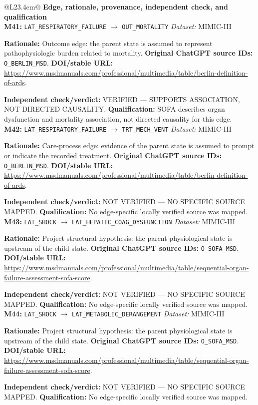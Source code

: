 \begin{tabular}{@{}L{23.4cm}@{}}
\toprule
\textbf{Edge, rationale, provenance, independent check, and qualification}\\
\midrule
\textbf{M41:} \nolinkurl{LAT_RESPIRATORY_FAILURE} $\rightarrow$ \nolinkurl{OUT_MORTALITY} \hfill \textit{Dataset:} MIMIC-III\par\textbf{Rationale:} Outcome edge: the parent state is assumed to represent pathophysiologic burden related to mortality. \textbf{Original ChatGPT source IDs:} \nolinkurl{O_BERLIN_MSD}. \textbf{DOI/stable URL:} \url{https://www.msdmanuals.com/professional/multimedia/table/berlin-definition-of-ards}.\par\textbf{Independent check/verdict:} VERIFIED --- SUPPORTS ASSOCIATION, NOT DIRECTED CAUSALITY. \textbf{Qualification:} SOFA describes organ dysfunction and mortality association, not directed causality for this edge. \\
\addlinespace[2pt]
\midrule
\textbf{M42:} \nolinkurl{LAT_RESPIRATORY_FAILURE} $\rightarrow$ \nolinkurl{TRT_MECH_VENT} \hfill \textit{Dataset:} MIMIC-III\par\textbf{Rationale:} Care-process edge: evidence of the parent state is assumed to prompt or indicate the recorded treatment. \textbf{Original ChatGPT source IDs:} \nolinkurl{O_BERLIN_MSD}. \textbf{DOI/stable URL:} \url{https://www.msdmanuals.com/professional/multimedia/table/berlin-definition-of-ards}.\par\textbf{Independent check/verdict:} NOT VERIFIED --- NO SPECIFIC SOURCE MAPPED. \textbf{Qualification:} No edge-specific locally verified source was mapped. \\
\addlinespace[2pt]
\midrule
\textbf{M43:} \nolinkurl{LAT_SHOCK} $\rightarrow$ \nolinkurl{LAT_HEPATIC_COAG_DYSFUNCTION} \hfill \textit{Dataset:} MIMIC-III\par\textbf{Rationale:} Project structural hypothesis: the parent physiological state is upstream of the child state. \textbf{Original ChatGPT source IDs:} \nolinkurl{O_SOFA_MSD}. \textbf{DOI/stable URL:} \url{https://www.msdmanuals.com/professional/multimedia/table/sequential-organ-failure-assessment-sofa-score}.\par\textbf{Independent check/verdict:} NOT VERIFIED --- NO SPECIFIC SOURCE MAPPED. \textbf{Qualification:} No edge-specific locally verified source was mapped. \\
\addlinespace[2pt]
\midrule
\textbf{M44:} \nolinkurl{LAT_SHOCK} $\rightarrow$ \nolinkurl{LAT_METABOLIC_DERANGEMENT} \hfill \textit{Dataset:} MIMIC-III\par\textbf{Rationale:} Project structural hypothesis: the parent physiological state is upstream of the child state. \textbf{Original ChatGPT source IDs:} \nolinkurl{O_SOFA_MSD}. \textbf{DOI/stable URL:} \url{https://www.msdmanuals.com/professional/multimedia/table/sequential-organ-failure-assessment-sofa-score}.\par\textbf{Independent check/verdict:} NOT VERIFIED --- NO SPECIFIC SOURCE MAPPED. \textbf{Qualification:} No edge-specific locally verified source was mapped. \\

\end{tabular}
